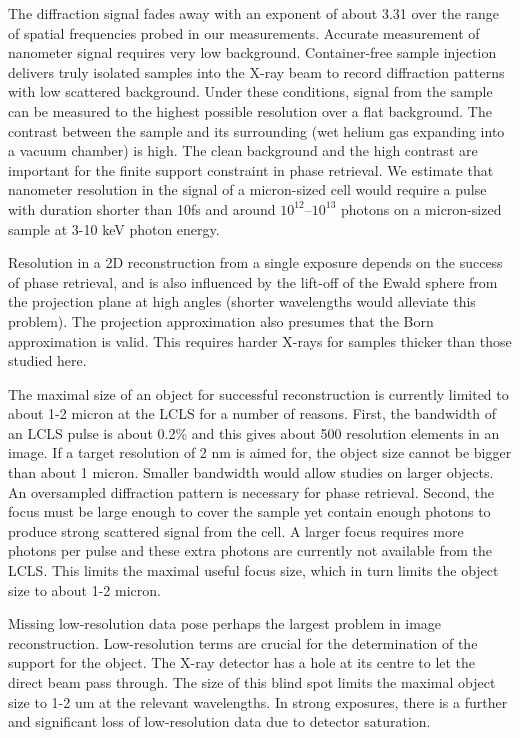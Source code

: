 The diffraction signal fades away with an exponent of  about 3.31 over the range of spatial frequencies probed in our measurements. Accurate measurement of nanometer signal requires very low background. Container-free sample injection delivers truly isolated samples into the X-ray beam to record diffraction patterns with low scattered background. Under these conditions, signal from the sample can be measured to the highest possible resolution over a flat background. The contrast between the sample and its surrounding (wet helium gas expanding into a vacuum chamber) is high. The clean background and the high contrast are important for the finite support constraint in phase retrieval. We estimate that nanometer resolution in the signal of a micron-sized cell would require a pulse with duration shorter than 10fs and around $10^{12}$–$10^{13}$ photons on a micron-sized sample at 3-10 keV photon energy.

Resolution in a 2D reconstruction from a single exposure depends on the success of phase retrieval, and is also influenced by the lift-off of the Ewald sphere from the projection plane at high angles (shorter wavelengths would alleviate this problem). The projection approximation also presumes that the Born approximation is valid. This requires harder X-rays for samples thicker than those studied here.

The maximal size of an object for successful reconstruction is currently limited to about 1-2 micron at the LCLS for a number of reasons. 
First, the bandwidth of an LCLS pulse is about 0.2\% and this gives about 500 resolution elements in an image. If a target resolution of 2 nm is aimed for, the object size cannot be bigger than about 1 micron. Smaller bandwidth would allow studies on larger objects. An oversampled diffraction pattern is necessary for phase retrieval. 
Second, the focus must be large enough to cover the sample yet contain enough photons to produce strong scattered signal from the cell. A larger focus requires more photons per pulse and these extra photons are currently not available from the LCLS. This limits the maximal useful focus size, which in turn limits the object size to about 1-2 micron.

Missing low-resolution data pose perhaps the largest problem in image reconstruction. Low-resolution terms are crucial for the determination of the support for the object. The X-ray detector has a hole at its centre to let the direct beam pass through. The size of this blind spot limits the maximal object size to 1-2 um at the relevant wavelengths. In strong exposures, there is a further and significant loss of low-resolution data due to detector saturation.

